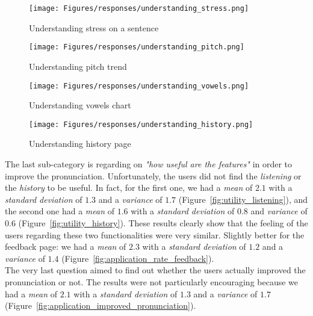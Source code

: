 \begin{figure}[!ht]
	\centering
	\begin{minipage}{.5\textwidth}
		\centering
		\texttt{[image: Figures/responses/understanding\_stress.png]}
		\caption{Understanding stress on a sentence}
		\label{fig:understanding_stress}
	\end{minipage}%
	\begin{minipage}{.5\textwidth}
		\centering
		\texttt{[image: Figures/responses/understanding\_pitch.png]}
		\caption{Understanding pitch trend}
		\label{fig:understanding_pitch}
	\end{minipage}
	\begin{minipage}{.5\textwidth}
		\centering
		\texttt{[image: Figures/responses/understanding\_vowels.png]}
		\caption{Understanding vowels chart}
		\label{fig:understanding_vowels}
	\end{minipage}%
	\begin{minipage}{.5\textwidth}
		\centering
		\texttt{[image: Figures/responses/understanding\_history.png]}
		\caption{Understanding history page}
		\label{fig:understanding_history}
	\end{minipage}%
\end{figure}

\noindent The last sub-category is regarding on \textit{"how useful are the features"} in order to improve the pronunciation. Unfortunately, the users did not find the \textit{listening} or the \textit{history} to be useful. In fact, for the first one, we had a \textit{mean} of $2.1$ with a \textit{standard deviation} of $1.3$ and a \textit{variance} of $1.7$ (Figure~\ref{fig:utility_listening}), and the second one had a \textit{mean} of $1.6$ with a \textit{standard deviation} of $0.8$ and \textit{variance} of $0.6$ (Figure~\ref{fig:utility_history}). These results clearly show that the feeling of the users regarding these two functionalities were very similar. Slightly better for the feedback page: we had a \textit{mean} of $2.3$ with a \textit{standard deviation} of $1.2$ and a \textit{variance} of $1.4$ (Figure~\ref{fig:application_rate_feedback}). \\
\noindent The very last question aimed to find out whether the users actually improved the pronunciation or not. The results were not particularly encouraging because we had a \textit{mean} of $2.1$ with a \textit{standard deviation} of $1.3$ and a \textit{variance} of $1.7$ (Figure~\ref{fig:application_improved_pronunciation}).

